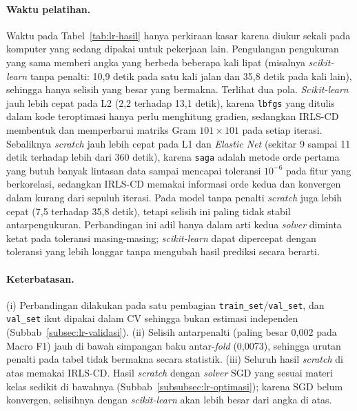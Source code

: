 \paragraph{Waktu pelatihan.} Waktu pada Tabel~\ref{tab:lr-hasil} hanya perkiraan kasar karena diukur sekali pada komputer yang sedang dipakai untuk pekerjaan lain. Pengulangan pengukuran yang sama memberi angka yang berbeda beberapa kali lipat (misalnya \textit{scikit-learn} tanpa penalti: 10,9 detik pada satu kali jalan dan 35,8 detik pada kali lain), sehingga hanya selisih yang besar yang bermakna. Terlihat dua pola. \textit{Scikit-learn} jauh lebih cepat pada L2 (2,2 terhadap 13,1 detik), karena \texttt{lbfgs} yang ditulis dalam kode teroptimasi hanya perlu menghitung gradien, sedangkan IRLS-CD membentuk dan memperbarui matriks Gram $101 \times 101$ pada setiap iterasi. Sebaliknya \textit{scratch} jauh lebih cepat pada L1 dan \textit{Elastic Net} (sekitar 9 sampai 11 detik terhadap lebih dari 360 detik), karena \texttt{saga} adalah metode orde pertama yang butuh banyak lintasan data sampai mencapai toleransi $10^{-6}$ pada fitur yang berkorelasi, sedangkan IRLS-CD memakai informasi orde kedua dan konvergen dalam kurang dari sepuluh iterasi. Pada model tanpa penalti \textit{scratch} juga lebih cepat (7,5 terhadap 35,8 detik), tetapi selisih ini paling tidak stabil antarpengukuran. Perbandingan ini adil hanya dalam arti kedua \textit{solver} diminta ketat pada toleransi masing-masing; \textit{scikit-learn} dapat dipercepat dengan toleransi yang lebih longgar tanpa mengubah hasil prediksi secara berarti.

\paragraph{Keterbatasan.} (i) Perbandingan dilakukan pada satu pembagian \texttt{train\_set}/\allowbreak\texttt{val\_set}, dan \texttt{val\_set} ikut dipakai dalam CV sehingga bukan estimasi independen (Subbab~\ref{subsec:lr-validasi}). (ii) Selisih antarpenalti (paling besar 0,002 pada Macro F1) jauh di bawah simpangan baku antar-\textit{fold} (0,0073), sehingga urutan penalti pada tabel tidak bermakna secara statistik. (iii) Seluruh hasil \textit{scratch} di atas memakai IRLS-CD. Hasil \textit{scratch} dengan \textit{solver} SGD yang sesuai materi kelas sedikit di bawahnya (Subbab~\ref{subsubsec:lr-optimasi}); karena SGD belum konvergen, selisihnya dengan \textit{scikit-learn} akan lebih besar dari angka di atas.
